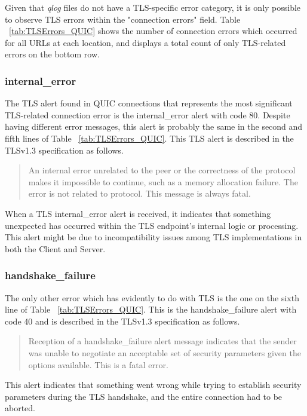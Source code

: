 \documentclass{l4proj}
\begin{document}
Given that \emph{qlog} files do not have a TLS-specific error category, it is only possible to observe TLS errors within the "connection errors" field. Table ~\ref{tab:TLSErrors_QUIC} shows the number of connection errors which occurred for all URLs at each location, and displays a total count of only TLS-related errors on the bottom row.

\subsubsection{internal\_error} The TLS alert found in QUIC connections that represents the most significant TLS-related connection error is the internal\_error alert with code 80. Despite having different error messages, this alert is probably the same in the second and fifth lines of Table ~\ref{tab:TLSErrors_QUIC}. This TLS alert is described in the TLSv1.3 specification as follows.

\begin{quote}
    An internal error unrelated to the peer or the correctness of the protocol makes it impossible to continue, such as a memory allocation failure. The error is not related to protocol. This message is always fatal. 
    \citep{Resc2018}
\end{quote} 

When a TLS internal\_error alert is received, it indicates that something unexpected has occurred within the TLS endpoint's internal logic or processing. This alert might be due to incompatibility issues among TLS implementations in both the Client and Server.


\subsubsection{handshake\_failure} The only other error which has evidently to do with TLS is the one on the sixth line of Table ~\ref{tab:TLSErrors_QUIC}. This is the handshake\_failure alert with code 40 and is described in the TLSv1.3 specification as follows.

\begin{quote}
    Reception of a handshake\_failure alert message indicates that the sender was unable to negotiate an acceptable set of security parameters given the options available. This is a fatal error.
    \citep{Resc2018}
\end{quote}

This alert indicates that something went wrong while trying to establish security parameters during the TLS handshake, and the entire connection had to be aborted.
\end{document}
